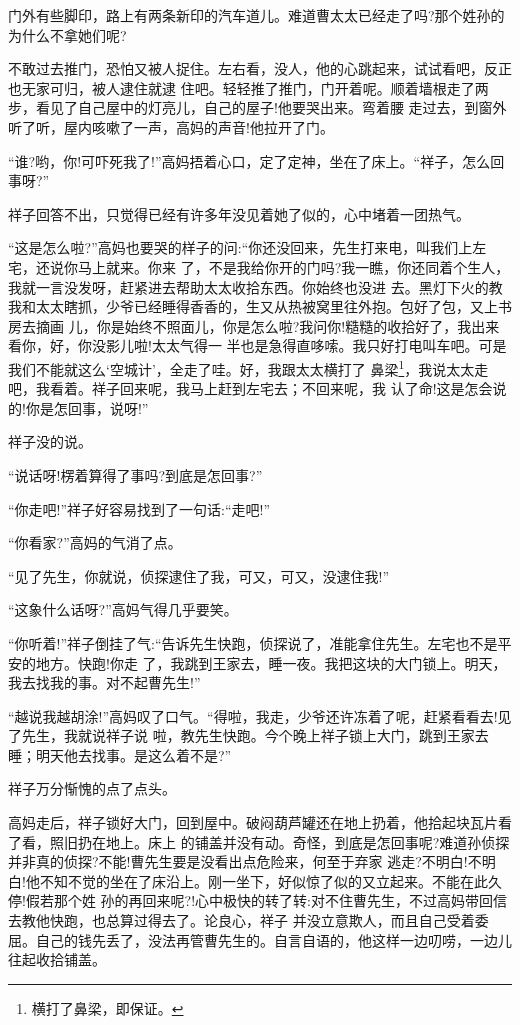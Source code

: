 \documentclass[11pt,a4paper,onecolumn]{article}
\begin{document}
门外有些脚印，路上有两条新印的汽车道儿。难道曹太太已经走了吗?那个姓孙的为什么不拿她们呢?

不敢过去推门，恐怕又被人捉住。左右看，没人，他的心跳起来，试试看吧，反正也无家可归，被人逮住就逮
住吧。轻轻推了推门，门开着呢。顺着墙根走了两步，看见了自己屋中的灯亮儿，自己的屋子!他要哭出来。弯着腰
走过去，到窗外听了听，屋内咳嗽了一声，高妈的声音!他拉开了门。

``谁?哟，你!可吓死我了!''高妈捂着心口，定了定神，坐在了床上。``祥子，怎么回事呀?''

祥子回答不出，只觉得已经有许多年没见着她了似的，心中堵着一团热气。

``这是怎么啦?''高妈也要哭的样子的问:``你还没回来，先生打来电，叫我们上左宅，还说你马上就来。你来
了，不是我给你开的门吗?我一瞧，你还同着个生人，我就一言没发呀，赶紧进去帮助太太收拾东西。你始终也没进
去。黑灯下火的教我和太太瞎抓，少爷已经睡得香香的，生又从热被窝里往外抱。包好了包，又上书房去摘画
儿，你是始终不照面儿，你是怎么啦?我问你!糙糙的收拾好了，我出来看你，好，你没影儿啦!太太气得\myrule 一
半也是急得\myrule 直哆嗦。我只好打电叫车吧。可是我们不能就这么`空城计'，全走了哇。好，我跟太太横打了
鼻梁\footnote{横打了鼻梁，即保证。}，我说太太走吧，我看着。祥子回来呢，我马上赶到左宅去；不回来呢，我
认了命!这是怎会说的!你是怎回事，说呀!''

祥子没的说。

``说话呀!楞着算得了事吗?到底是怎回事?''

``你走吧!''祥子好容易找到了一句话:``走吧!''

``你看家?''高妈的气消了点。

``见了先生，你就说，侦探逮住了我，可又，可又，没逮住我!''

``这象什么话呀?''高妈气得几乎要笑。

``你听着!''祥子倒挂了气:``告诉先生快跑，侦探说了，准能拿住先生。左宅也不是平安的地方。快跑!你走
了，我跳到王家去，睡一夜。我把这块的大门锁上。明天，我去找我的事。对不起曹先生!''

``越说我越胡涂!''高妈叹了口气。``得啦，我走，少爷还许冻着了呢，赶紧看看去!见了先生，我就说祥子说
啦，教先生快跑。今个晚上祥子锁上大门，跳到王家去睡；明天他去找事。是这么着不是?''

祥子万分惭愧的点了点头。

高妈走后，祥子锁好大门，回到屋中。破闷葫芦罐还在地上扔着，他拾起块瓦片看了看，照旧扔在地上。床上
的铺盖并没有动。奇怪，到底是怎回事呢?难道孙侦探并非真的侦探?不能!曹先生要是没看出点危险来，何至于弃家
逃走?不明白!不明白!他不知不觉的坐在了床沿上。刚一坐下，好似惊了似的又立起来。不能在此久停!假若那个姓
孙的再回来呢?!心中极快的转了转:对不住曹先生，不过高妈带回信去教他快跑，也总算过得去了。论良心，祥子
并没立意欺人，而且自己受着委屈。自己的钱先丢了，没法再管曹先生的。自言自语的，他这样一边叨唠，一边儿
往起收拾铺盖。
\end{document}
